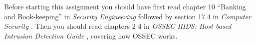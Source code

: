 Before starting this assignment you should have first read chapter 10 ``Banking 
and Book-keeping'' in \emph{Security Engineering} \cite{Anderson2008sea} 
followed by section 17.4 in \emph{Computer Security} \cite{Gollmann2011cs}.
Then you should read chapters 2-4 in \emph{OSSEC HIDS: Host-based Intrusion 
Detection Guide} \cite{ossec2,ossec3,ossec4}, covering how OSSEC works.

